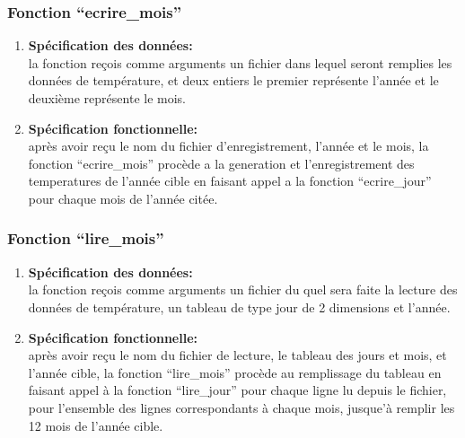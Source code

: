 \subsubsection{Fonction ``ecrire\_mois''}
\begin{enumerate}[label=\textbf{\Alph* --}]
	\item \textbf{Spécification des données: \\}
	la fonction reçois comme arguments un fichier dans lequel seront remplies les données de température, et deux entiers le premier représente l’année et le deuxième représente le mois. 
		
    \item \textbf{Spécification fonctionnelle: \\}
    après avoir reçu le nom du fichier d’enregistrement, l’année et le mois, la fonction ``ecrire\_mois''
     procède a la generation et l’enregistrement des temperatures de l’année cible en faisant appel a la fonction 
     ``ecrire\_jour'' pour chaque mois de l’année citée.

\end{enumerate}

\subsubsection{Fonction ``lire\_mois''}
\begin{enumerate}[label=\textbf{\Alph* --}]
	\item \textbf{Spécification des données: \\}
	la fonction reçois comme arguments un fichier du quel sera faite la lecture des données de température, un tableau de type jour de 2 dimensions et l’année. 
		
    \item \textbf{Spécification fonctionnelle: \\}
    après avoir reçu le nom du fichier de lecture, le tableau des jours et mois, et l’année cible, la fonction ``lire\_mois'' procède au remplissage du tableau en faisant appel à la fonction ``lire\_jour'' pour chaque ligne lu depuis le fichier, pour l’ensemble des lignes correspondants à chaque mois, jusque’à remplir les 12 mois de l’année cible. 

\end{enumerate}


